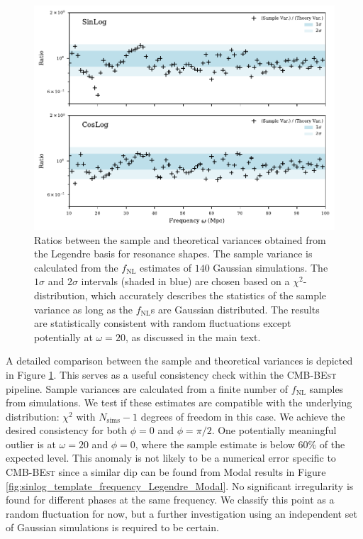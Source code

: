 \begin{figure}[htbp!] 
	\centering    
	\includegraphics{sinlog_template_frequency_variances_Legendre.pdf}
	\caption{Ratios between the sample and theoretical variances obtained from the Legendre basis for resonance shapes. The sample variance is calculated from the $f_\text{NL}$ estimates of $140$ Gaussian simulations. The $1\sigma$ and $2\sigma$ intervals (shaded in blue) are chosen based on a $\chi^2$-distribution, which accurately describes the statistics of the sample variance as long as the $f_\text{NL}$s are Gaussian distributed. The results are statistically consistent with random fluctuations except potentially at $\omega=20$, as discussed in the main text.}
	\label{fig:sinlog_template_frequency_variances_Legendre}
\end{figure}

A detailed comparison between the sample and theoretical variances is depicted in Figure \ref{fig:sinlog_template_frequency_variances_Legendre}. This serves as a useful consistency check within the \textsc{CMB-BEst} pipeline. Sample variances are calculated from a finite number of $f_\text{NL}$ samples from simulations. We test if these estimates are compatible with the underlying distribution: $\chi^2$ with $N_\text{sims}-1$ degrees of freedom in this case. We achieve the desired consistency for both $\phi=0$ and $\phi=\pi/2$. One potentially meaningful outlier is at $\omega=20$ and $\phi=0$, where the sample estimate is below 60\% of the expected level. This anomaly is not likely to be a numerical error specific to \textsc{CMB-BEst} since a similar dip can be found from Modal results in Figure \ref{fig:sinlog_template_frequency_Legendre_Modal}. No significant irregularity is found for different phases at the same frequency. We classify this point as a random fluctuation for now, but a further investigation using an independent set of Gaussian simulations is required to be certain.

